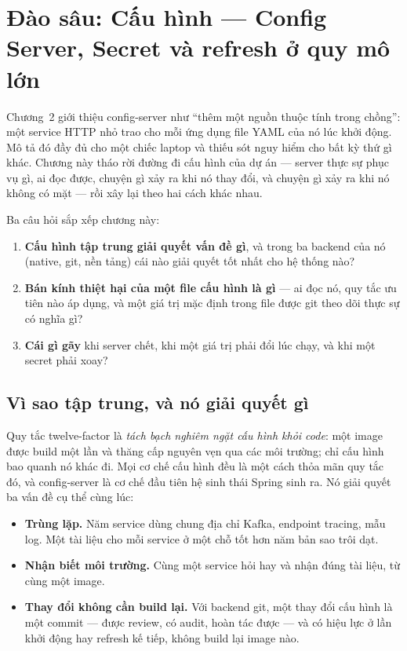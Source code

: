 \chapter{Đào sâu: Cấu hình --- Config Server, Secret và refresh ở quy mô lớn}
\label{ch:dd-config}

Chương~2 giới thiệu config-server như ``thêm một nguồn thuộc tính trong
chồng'': một service HTTP nhỏ trao cho mỗi ứng dụng file YAML của nó lúc
khởi động. Mô tả đó đầy đủ cho một chiếc laptop và thiếu sót nguy hiểm
cho bất kỳ thứ gì khác. Chương này tháo rời đường đi cấu hình của dự án
--- server thực sự phục vụ gì, ai đọc được, chuyện gì xảy ra khi nó thay
đổi, và chuyện gì xảy ra khi nó không có mặt --- rồi xây lại theo hai
cách khác nhau.

Ba câu hỏi sắp xếp chương này:

\begin{enumerate}
  \item \textbf{Cấu hình tập trung giải quyết vấn đề gì}, và trong ba
  backend của nó (native, git, nền tảng) cái nào giải quyết tốt nhất cho
  hệ thống nào?
  \item \textbf{Bán kính thiệt hại của một file cấu hình là gì} --- ai
  đọc nó, quy tắc ưu tiên nào áp dụng, và một giá trị mặc định trong
  file được git theo dõi thực sự có nghĩa gì?
  \item \textbf{Cái gì gãy} khi server chết, khi một giá trị phải đổi
  lúc chạy, và khi một secret phải xoay?
\end{enumerate}

\section{Vì sao tập trung, và nó giải quyết gì}

Quy tắc twelve-factor là \emph{tách bạch nghiêm ngặt cấu hình khỏi
code}: một image được build một lần và thăng cấp nguyên vẹn qua các môi
trường; chỉ cấu hình bao quanh nó khác đi. Mọi cơ chế cấu hình đều là
một cách thỏa mãn quy tắc đó, và config-server là cơ chế đầu tiên hệ
sinh thái Spring sinh ra. Nó giải quyết ba vấn đề cụ thể cùng lúc:

\begin{itemize}
  \item \textbf{Trùng lặp.} Năm service dùng chung địa chỉ Kafka,
  endpoint tracing, mẫu log. Một tài liệu cho mỗi service ở một chỗ tốt
  hơn năm bản sao trôi dạt.
  \item \textbf{Nhận biết môi trường.} Cùng một service hỏi
   hay  và nhận
  đúng tài liệu, từ cùng một image.
  \item \textbf{Thay đổi không cần build lại.} Với backend git, một thay
  đổi cấu hình là một commit --- được review, có audit, hoàn tác được ---
  và có hiệu lực ở lần khởi động hay refresh kế tiếp, không build lại
  image nào.
\end{itemize}

